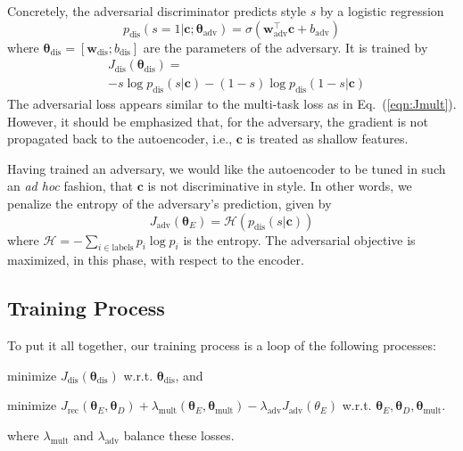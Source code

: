 \documentclass[11pt,a4paper]{article}
\begin{document}
Concretely, the adversarial discriminator predicts style $s$ by a logistic regression
\vspace{-.3cm}
\begin{equation}
	p_\text{dis}(s=1|\bm c;\bm\theta_\text{adv})=\sigma(\bm w_\text{adv}^\top \bm c + b_\text{adv})
\end{equation}
where $\bm\theta_\text{dis}=[\bm w_\text{dis}; b_\text{dis}]$ are the parameters of the adversary. It is trained by
\begin{align}
	 & J_\text{dis}(\bm\theta_\text{dis})=                            \\ \nonumber
	 & -s\log p_\text{dis}(s|\bm c)-(1-s)\log p_\text{dis}(1-s|\bm c)
\end{align}
The adversarial loss appears similar to the multi-task loss as in Eq.~(\ref{eqn:Jmult}). However, it should be emphasized that, for the adversary, the gradient is not propagated back to the autoencoder, i.e., $\bm c$ is treated as shallow features.

Having trained an adversary, we would like the autoencoder to be tuned in such an \textit{ad hoc} fashion, that $\bm c$ is not discriminative in style. In other words, we penalize the entropy of the adversary's prediction, given by
\begin{equation}
	J_\text{adv}(\bm\theta_E)=\mathcal{H}(p_\text{dis}(s|\bm c))
\end{equation}
where $\mathcal{H}=-\sum_{i\in\text{labels}}p_i\log p_i$ is the entropy. The adversarial objective is maximized, in this phase, with respect to the encoder.



\subsection{Training Process}

To put it all together, our training process is a loop of the following processes:
\begin{compactenum}
	\item minimize $J_\text{dis}(\bm\theta_\text{dis})$ w.r.t. $\bm\theta_\text{dis}$, and
	\item minimize $J_\text{rec}(\bm\theta_E, \bm\theta_D) + \lambda_\text{mult}(\bm\theta_E,\bm\theta_\text{mult}) -\lambda_\text{adv}
		J_\text{adv}(\theta_E)$ w.r.t. $\bm\theta_E, \bm\theta_D, \bm\theta_\text{mult}$.
\end{compactenum}
where $\lambda_\text{mult}$ and $\lambda_\text{adv}$ balance these losses.
\end{document}
